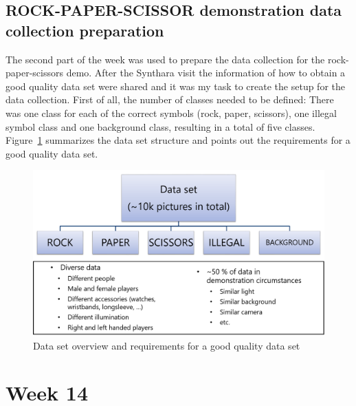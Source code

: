 \subsection{ROCK-PAPER-SCISSOR demonstration data collection preparation}
The second part of the week was used to prepare the data collection for the rock-paper-scissors demo. After the Synthara visit the information of how to obtain a good quality data set were shared and it was my task to create the setup for the data collection. First of all, the number of classes needed to be defined: There was one class for each of the correct symbols (rock, paper, scissors), one illegal symbol class and one background class, resulting in a total of five classes. Figure~\ref{fig:dataset_overview} summarizes the data set structure and points out the requirements for a good quality data set.
\begin{figure}[!htb]
	\centering
		\includegraphics[width=\textwidth]{bilder/dataset_overview.png}
		\caption{Data set overview and requirements for a good quality data set}
		\label{fig:dataset_overview}
\end{figure}

\section{Week 14}
